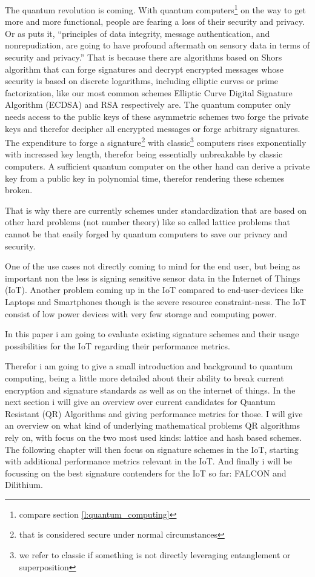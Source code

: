 \documentclass[conference]{IEEEtran}
\begin{document}
The quantum revolution is coming. With quantum computers\footnote{compare section \ref{l:quantum_computing}} on the way to get more and more functional, people are fearing a loss of their security and privacy.
Or as \cite{QR_sigs} puts it, ``principles of data integrity, message authentication, and nonrepudiation, are going to have profound aftermath on sensory data in terms of security and privacy.''
That is because there are algorithms based on Shors algorithm that can forge signatures and decrypt encrypted messages whose security is based on discrete logarithms, including elliptic curves or prime factorization, like our most common schemes Elliptic Curve Digital Signature Algorithm (ECDSA) and RSA respectively are.
The quantum computer only needs access to the public keys of these asymmetric schemes two forge the private keys and therefor decipher all encrypted messages or forge arbitrary signatures.
The expenditure to forge a signature\footnote{that is considered secure under normal circumstances 
} with classic\footnote{we refer to classic if something is not directly leveraging entanglement or superposition} computers rises exponentially with increased key length, therefor being essentially unbreakable by classic computers.
A sufficient quantum computer on the other hand can derive a private key from a public key in polynomial time, therefor rendering these schemes broken.

That is why there are currently schemes under standardization\cite{PQClean-GH,nist_finalists_website} that are based on other hard problems (not number theory) like so called lattice problems that cannot be that easily forged by quantum computers to save our privacy and security.

One of the use cases not directly coming to mind for the end user, but being as important non the less is signing sensitive sensor data in the Internet of Things (IoT).
Another problem coming up in the IoT compared to end-user-devices like Laptops and Smartphones though is the severe resource constraint-ness. 
The IoT consist of low power devices with very few storage and computing power.

In this paper i am going to evaluate existing signature schemes and their usage possibilities for the IoT regarding their performance metrics.

Therefor i am going to give a small introduction and background to quantum computing, being a little more detailed about their ability to break current encryption and signature standards as well as on the internet of things.
In the next section i will give an overview over current candidates for Quantum Resistant (QR) Algorithms and giving performance metrics for those.
I will give an overview on what kind of underlying mathematical problems QR algorithms rely on, with focus on the two most used kinds: lattice and hash based schemes. 
The following chapter will then focus on signature schemes in the IoT, starting with additional performance metrics relevant in the IoT.
And finally i will be focussing on the best signature contenders for the IoT so far: FALCON and Dilithium.
\end{document}
